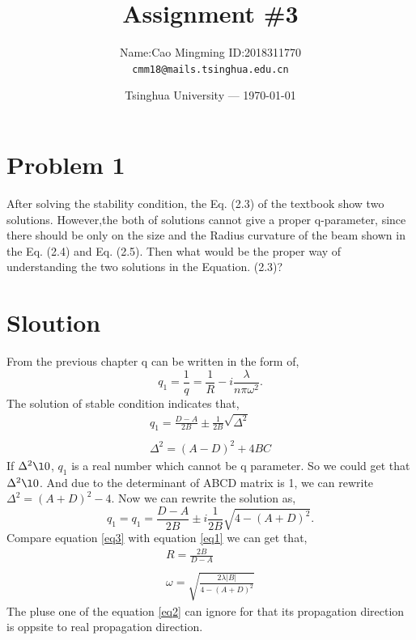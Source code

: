\documentclass{article}
\title{Assignment \#3}
\author{Name:Cao Mingming \indent \indent ID:2018311770\\ 
\texttt{cmm18@mails.tsinghua.edu.cn}}
\date{Tsinghua University --- \today}
\begin{document}
\maketitle 

\section{Problem 1}
After solving the stability condition, the Eq. (2.3) of the textbook show two solutions. However,the both of solutions cannot give a proper q-parameter, since there should be only on the size and the Radius curvature of the beam shown in the Eq. (2.4) and Eq. (2.5). Then what would be the proper way of understanding the two solutions in the Equation. (2.3)?

\section*{Sloution}
From the previous chapter q can be written in the form of,
\begin{equation}\label{eq1}
	q_1=\frac{1}{q}=\frac{1}{R}-i\frac{\lambda}{n\pi\omega^2}.
\end{equation}
The solution of stable condition indicates that,
\begin{equation}\label{eq2}
	\begin{array}{l}
		q_1=\frac{D-A}{2B}\pm\frac{1}{2B}\sqrt{\Delta^2}
		\\
		\\
		\Delta^2=(A-D)^2+4BC
	\end{array}
\end{equation}
If $\Delta^2\l 0$, $q_1$ is a real number which cannot be q parameter. So we could get that $\Delta^2\l0$. And due to the determinant of ABCD matrix is 1, we can rewrite $\Delta^2=(A+D)^2-4$.
Now we can rewrite the solution as,
\begin{equation}\label{eq3}
	q_1=q_1=\frac{D-A}{2B}\pm i\frac{1}{2B}\sqrt{4-(A+D)^2}.
\end{equation}
Compare equation \ref{eq3} with equation \ref{eq1} we can get that,
\begin{equation}
	\begin{array}{l}
		R=\frac{2B}{D-A}
		\\
		\\
		\omega=\sqrt{\frac{2\lambda|B|}{4-(A+D)^2}}
	\end{array}
\end{equation}
The pluse one of the equation \ref{eq2} can ignore for that its propagation direction is oppsite to real propagation direction.
\end{document}
